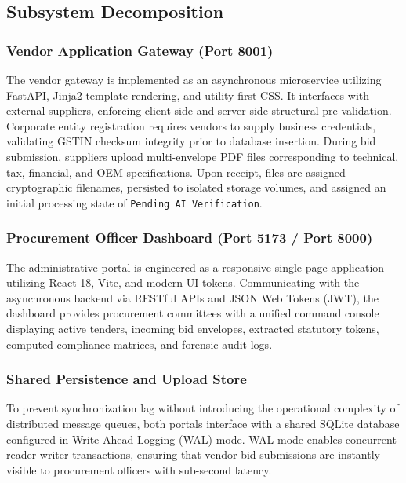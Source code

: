 \documentclass[conference]{IEEEtran}
\begin{document}
\subsection{Subsystem Decomposition}

\subsubsection{Vendor Application Gateway (Port 8001)}
The vendor gateway is implemented as an asynchronous microservice utilizing FastAPI, Jinja2 template rendering, and utility-first CSS. It interfaces with external suppliers, enforcing client-side and server-side structural pre-validation. Corporate entity registration requires vendors to supply business credentials, validating GSTIN checksum integrity prior to database insertion. During bid submission, suppliers upload multi-envelope PDF files corresponding to technical, tax, financial, and OEM specifications. Upon receipt, files are assigned cryptographic filenames, persisted to isolated storage volumes, and assigned an initial processing state of \texttt{Pending AI Verification}.

\subsubsection{Procurement Officer Dashboard (Port 5173 / Port 8000)}
The administrative portal is engineered as a responsive single-page application utilizing React 18, Vite, and modern UI tokens. Communicating with the asynchronous backend via RESTful APIs and JSON Web Tokens (JWT), the dashboard provides procurement committees with a unified command console displaying active tenders, incoming bid envelopes, extracted statutory tokens, computed compliance matrices, and forensic audit logs.

\subsubsection{Shared Persistence and Upload Store}
To prevent synchronization lag without introducing the operational complexity of distributed message queues, both portals interface with a shared SQLite database configured in Write-Ahead Logging (WAL) mode. WAL mode enables concurrent reader-writer transactions, ensuring that vendor bid submissions are instantly visible to procurement officers with sub-second latency.
\end{document}
